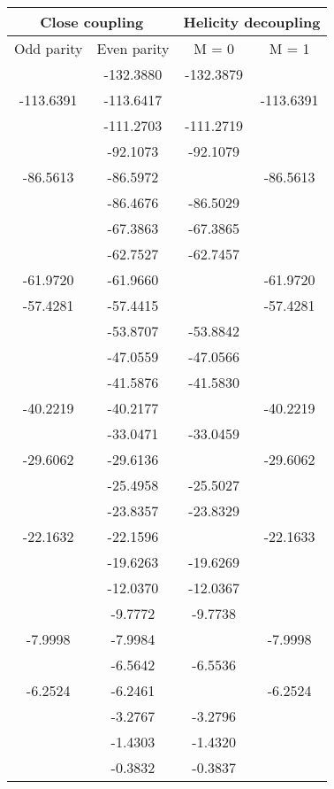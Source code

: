 \documentclass[12pt]{article}
\begin{document}
\begin{table}[H]
\begin{center}
\begin{tabular}{cccc}
\toprule[1.5pt]
\multicolumn{2}{c}{Close coupling} & \multicolumn{2}{c}{Helicity decoupling} \\
\toprule[1.5pt]
Odd parity & Even parity & M = 0 & M = 1\\ 
\midrule
& -132.3880 & -132.3879 & \\ 
-113.6391 & -113.6417 & & -113.6391\\& -111.2703 & -111.2719 & \\ 
& -92.1073 & -92.1079 & \\ 
-86.5613 & -86.5972 & & -86.5613\\& -86.4676 & -86.5029 & \\ 
& -67.3863 & -67.3865 & \\ 
& -62.7527 & -62.7457 & \\ 
-61.9720 & -61.9660 & & -61.9720\\-57.4281 & -57.4415 & & -57.4281\\& -53.8707 & -53.8842 & \\ 
& -47.0559 & -47.0566 & \\ 
& -41.5876 & -41.5830 & \\ 
-40.2219 & -40.2177 & & -40.2219\\& -33.0471 & -33.0459 & \\ 
-29.6062 & -29.6136 & & -29.6062\\& -25.4958 & -25.5027 & \\ 
& -23.8357 & -23.8329 & \\ 
-22.1632 & -22.1596 & & -22.1633\\& -19.6263 & -19.6269 & \\ 
& -12.0370 & -12.0367 & \\ 
& -9.7772 & -9.7738 & \\ 
-7.9998 & -7.9984 & & -7.9998\\& -6.5642 & -6.5536 & \\ 
-6.2524 & -6.2461 & & -6.2524\\& -3.2767 & -3.2796 & \\ 
& -1.4303 & -1.4320 & \\ 
& -0.3832 & -0.3837 & \\ 
\bottomrule
\end{tabular}
\end{center}
\end{table}
\end{document}
